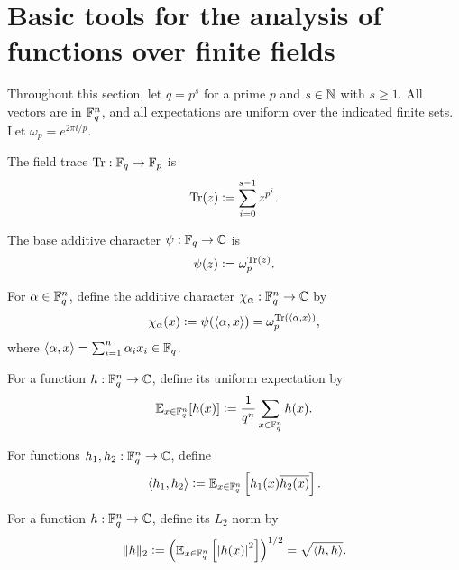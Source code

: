 \section{Basic tools for the analysis of functions over finite fields}

Throughout this section, let $q=p^s$ for a prime $p$ and $s\in{\mathbb N}$ with $s\ge 1$.
All vectors are in ${\mathbb F}_q^n$, and all expectations are uniform over the indicated finite sets.
Let $\omega_p = e^{2\pi i/p}$.

\begin{definition}
\label{def:field-trace}
\leanok
The field trace ${\rm Tr}: {\mathbb F}_q \to {\mathbb F}_p$ is
\[
    {\rm Tr}(z) \mathrel{\mathop:}= \sum_{i=0}^{s-1} z^{p^i}.
\]
\end{definition}

\begin{definition}
\label{def:base-character}
\leanok
The base additive character $\psi:{\mathbb F}_q\to{\mathbb C}$ is
\[
    \psi(z) \mathrel{\mathop:}= \omega_p^{{\rm Tr}(z)}.
\]
\end{definition}

\begin{definition}
\label{def:additive-character}
\leanok
For $\alpha\in{\mathbb F}_q^n$, define the additive character
$\chi_\alpha: {\mathbb F}_q^n\to{\mathbb C}$ by
\[
    \chi_\alpha(x) \mathrel{\mathop:}= \psi(\langle \alpha, x \rangle)
    = \omega_p^{{\rm Tr}(\langle \alpha, x \rangle)},
\]
where $\langle \alpha, x \rangle=\sum_{i=1}^n \alpha_i x_i\in{\mathbb F}_q$.
\end{definition}

\begin{definition}[Expectation]
\label{def:expectation}
\leanok
For a function $h:{\mathbb F}_q^n\to{\mathbb C}$, define its uniform expectation by
\[
    {\mathbb E}_{x\in{\mathbb F}_q^n}[h(x)]
    \mathrel{\mathop:}= \frac{1}{q^n}\sum_{x\in{\mathbb F}_q^n} h(x).
\]
\end{definition}

\begin{definition}
\label{def:function-inner-product}
\leanok
For functions $h_1,h_2:{\mathbb F}_q^n\to{\mathbb C}$, define
\[
    \langle h_1, h_2 \rangle
    \mathrel{\mathop:}= {\mathbb E}_{x\in{\mathbb F}_q^n}\left[h_1(x)\overline{h_2(x)}\right].
\]
\end{definition}

\begin{definition}[$L_2$ norm]
\label{def:function-l2-norm}
\leanok
For a function $h:{\mathbb F}_q^n\to{\mathbb C}$, define its $L_2$ norm by
\[
    \|h\|_2
    \mathrel{\mathop:}=
    \left({\mathbb E}_{x\in{\mathbb F}_q^n}\left[\left\lvert{h(x)}\right\rvert^2\right]\right)^{1/2}
    =
    \sqrt{\langle h, h \rangle}.
\]
\end{definition}

